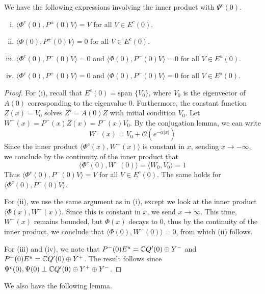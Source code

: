 \documentclass[thesis.tex]{subfiles}
\begin{document}
\begin{lemma}\label{PsiIP}
We have the following expressions involving the inner product with $\Psi^c(0)$.
\begin{enumerate}[(i)]
	\item $\langle \Phi^c(0), P^\pm(0) V \rangle = V$ for all $V \in E^c(0)$.
	\item $\langle \Phi(0), P^\pm(0) V \rangle = 0$ for all $V \in E^c(0)$.
	\item $\langle \Phi^c(0), P^-(0) V \rangle = 0$ and $\langle \Phi(0), P^-(0) V \rangle = 0$ for all $V \in E^u(0)$.
	\item $\langle \Phi^c(0), P^+(0) V \rangle = 0$ and $\langle \Phi(0), P^+(0) V \rangle = 0$ for all $V \in E^s(0)$.
\end{enumerate}
\begin{proof}
For (i), recall that $E^c(0) = \text{span }\{ V_0 \}$, where $V_0$ is the eigenvector of $A(0)$ corresponding to the eigenvalue 0. Furthermore, the constant function $Z(x) = V_0$ solves $Z' = A(0) Z$ with initial condition $V_0$. Let $W^-(x) = P^-(x) Z(x) = P^-(x) V_0$. By the conjugation lemma, we can write
\[
W^-(x) = V_0 + \mathcal{O}({e^{-\tilde{\alpha}|x|}})
\]
Since the inner product $\langle \Phi^c(x), W^-(x) \rangle$ is constant in $x$, sending $x \rightarrow -\infty$, we conclude by the continuity of the inner product that
\[
\langle \Phi^c(0), W^-(0) \rangle = \langle W_0, V_0 \rangle = 1 
\]
Thus $\langle \Phi^c(0), P^-(0) V \rangle = V$ for all $V \in E^c(0)$. The same holds for $\langle \Phi^c(0), P^+(0) V \rangle$.

For (ii), we use the same argument as in (i), except we look at the inner product $\langle \Phi(x), W^-(x) \rangle$. Since this is constant in $x$, we send $x \rightarrow \infty$. This time, $W^-(x)$ remains bounded, but $\Phi(x)$ decays to 0, thus by the continuity of the inner product, we conclude that $\langle \Phi(0), W^-(0) \rangle = 0$, from which (ii) follows.

For (iii) and (iv), we note that $P^-(0)E^u = \mathbb{C} Q'(0) \oplus Y^-$ and $P^+(0)E^u = \mathbb{C} Q'(0) \oplus Y^+$. The result follows since $\Psi^c(0), \Psi(0) \perp \mathbb{C} Q'(0) \oplus Y^+ \oplus Y^-$.
\end{proof}
\end{lemma}

We also have the following lemma.
\end{document}
